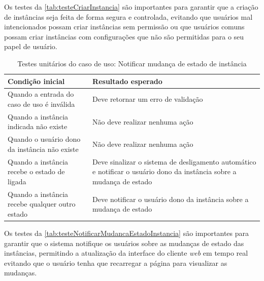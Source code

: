Os testes da \autoref{tab:testeCriarInstancia} são importantes para garantir que a criação de instâncias seja feita de forma segura e controlada, evitando que usuários mal intencionados possam criar instâncias sem permissão ou que usuários comuns possam criar instâncias com configurações que não são permitidas para o seu papel de usuário.

\begin{table}[h]
\caption{Testes unitários do caso de uso: Notificar mudança de estado de instância}
\label{tab:testeNotificarMudancaEstadoInstancia}
\begin{tabularx}{\textwidth}{p{} p{}}
\toprule
\textbf{Condição inicial} & \textbf{Resultado esperado} \\ \midrule

Quando a entrada do caso de uso é inválida & Deve retornar um erro de validação \\ \hline

Quando a instância indicada não existe & Não deve realizar nenhuma ação \\ \hline

Quando o usuário dono da instância não existe & Não deve realizar nenhuma ação \\ \hline

Quando a instância recebe o estado de ligada & Deve sinalizar o sistema de desligamento automático e notificar o usuário dono da instância sobre a mudança de estado \\ \hline

Quando a instância recebe qualquer outro estado & Deve notificar o usuário dono da instância sobre a mudança de estado \\

\bottomrule
\end{tabularx}
\end{table}

Os testes da \autoref{tab:testeNotificarMudancaEstadoInstancia} são importantes para garantir que o sistema notifique os usuários sobre as mudanças de estado das instâncias, permitindo a atualização da interface do cliente \textit{web} em tempo real evitando que o usuário tenha que recarregar a página para visualizar as mudanças.

